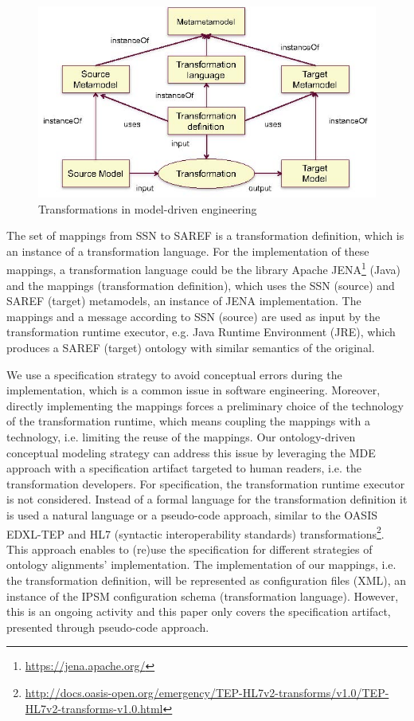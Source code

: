 \documentclass{sig-alternate-05-2015}
\begin{document}
\begin{figure}[h!]
\centering
\includegraphics[scale=0.39]{PastedGraphic-1}
\caption{Transformations in model-driven engineering}
\label{fig:PastedGraphic-1}
\end{figure}

The set of mappings from SSN to SAREF is a transformation definition, which is an instance of a transformation language. For the implementation of these mappings, a transformation language could be the library Apache JENA\footnote{\url{https://jena.apache.org/}} (Java) and the mappings (transformation definition), which uses the SSN (source) and SAREF (target) metamodels, an instance of JENA implementation. The mappings and a message according to SSN (source) are used as input by the transformation runtime executor, e.g. Java Runtime Environment (JRE), which produces a SAREF (target) ontology with similar semantics of the original. 

We use a specification strategy to avoid conceptual errors during the implementation, which is a common issue in software engineering. Moreover, directly implementing the mappings forces a preliminary choice of the technology of the transformation runtime, which means coupling the mappings with a technology, i.e. limiting the reuse of the mappings. Our ontology-driven conceptual modeling strategy \cite{Moreira2017} can address this issue by leveraging the MDE approach with a specification artifact targeted to human readers, i.e. the transformation developers. For specification, the transformation runtime executor is not considered. Instead of a formal language for the transformation definition it is used a natural language or a pseudo-code approach, similar to the OASIS EDXL-TEP and HL7 (syntactic interoperability standards) transformations\footnote{\url{http://docs.oasis-open.org/emergency/TEP-HL7v2-transforms/v1.0/TEP-HL7v2-transforms-v1.0.html}}. This approach enables to (re)use the specification for different strategies of ontology alignments’ implementation. The implementation of our mappings, i.e. the transformation definition, will be represented as configuration files (XML), an instance of the IPSM configuration schema (transformation language). However, this is an ongoing activity and this paper only covers the specification artifact, presented through pseudo-code approach. 
\end{document}
